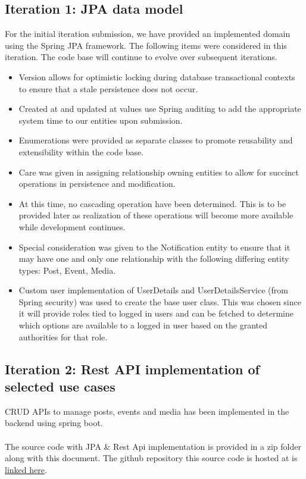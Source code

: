 \subsection{Iteration 1: JPA data model}
For the initial iteration submission, we have provided an implemented domain using the
Spring JPA framework. The following items were considered in this iteration. The code base will continue to evolve over subsequent iterations.
\begin{itemize}
    \item Version allows for optimistic locking during database transactional contexts to ensure that a stale persistence does not occur.

    \item Created at and updated at values use Spring auditing to add the appropriate system time to our entities upon submission.

    \item Enumerations were provided as separate classes to promote reusability and extensibility within the code base.

    \item Care was given in assigning relationship owning entities to allow for succinct operations in persistence and modification.

    \item At this time, no cascading operation have been determined. This is to be provided later as realization of these operations will become more available while development continues.

    \item Special consideration was given to the Notification entity to ensure that it may have one and only one relationship with the following differing entity types: Post, Event, Media.

    \item Custom user implementation of UserDetails and UserDetailsService (from Spring security) was used to create the base user class. This was chosen since it will provide roles tied to logged in users and can be fetched to determine which options are available to a logged in user based on the granted authorities for that role.
\end{itemize}

\subsection{Iteration 2: Rest API implementation of selected use cases}
CRUD APIs to manage posts, events and media has been implemented in the backend using spring boot.
\\
\\
The source code with JPA \& Rest Api implementation is provided in a zip folder along with this document. The github repository this source code is hosted at is \href{https://github.com/tkm3d1a/cs5324_s24_class_project}{linked here}.
